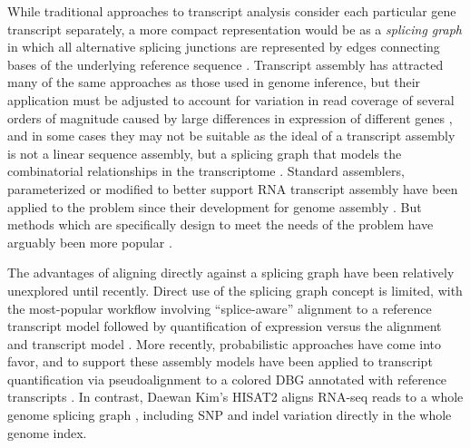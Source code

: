 While traditional approaches to transcript analysis consider each particular gene transcript separately, a more compact representation would be as a \emph{splicing graph} in which all alternative splicing junctions are represented by edges connecting bases of the underlying reference sequence \cite{heber2002splicing,lee2002POA}.
Transcript assembly has attracted many of the same approaches as those used in genome inference, but their application must be adjusted to account for variation in read coverage of several orders of magnitude caused by large differences in expression of different genes \cite{martin2011next}, and in some cases they may not be suitable as the ideal of a transcript assembly is not a linear sequence assembly, but a splicing graph that models the combinatorial relationships in the transcriptome \cite{grabherr2011trinity}.
Standard assemblers, parameterized or modified to better support RNA transcript assembly have been applied to the problem since their development for genome assembly \cite{birol2009novo,robertson2010novo,grabherr2011full,schulz2012oases}.
But methods which are specifically design to meet the needs of the problem have arguably been more popular \cite{grabherr2011trinity,chang2015bridger}.

The advantages of aligning directly against a splicing graph have been relatively unexplored until recently.
Direct use of the splicing graph concept is limited, with the most-popular workflow involving ``splice-aware'' alignment to a reference transcript model followed by quantification of expression versus the alignment and transcript model \cite{trapnell2012differential}.
More recently, probabilistic approaches have come into favor, and to support these assembly models have been applied to transcript quantification via pseudoalignment to a colored DBG annotated with reference transcripts \cite{bray2016near}.
In contrast, Daewan Kim's HISAT2 aligns RNA-seq reads to a whole genome splicing graph \cite{kim2015hisat,kim2017hisat2}, including SNP and indel variation directly in the whole genome index.

